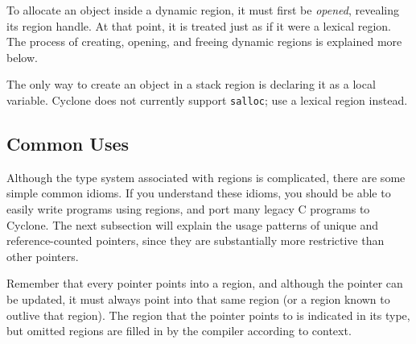 To allocate an object inside a dynamic region, it must first be
\emph{opened}, revealing its region handle.  At that point, it is treated
just as if it were a lexical region.  The process of creating, opening, and
freeing dynamic regions is explained more below.

The only way to create an object in a stack region is declaring it as
a local variable.  Cyclone does not currently support \texttt{salloc};
use a lexical region instead.

\subsection{Common Uses}
\label{sec:common-use}

Although the type system associated with regions is complicated, there are
some simple common idioms.  If you understand these idioms, you should be
able to easily write programs using regions, and port many legacy C programs
to Cyclone.  The next subsection will explain the usage patterns of unique
and reference-counted pointers, since they are substantially more
restrictive than other pointers.

Remember that every pointer points into a region, and although the
pointer can be updated, it must always point into that same region (or
a region known to outlive that region).  The region that the pointer
points to is indicated in its type, but omitted regions are filled in
by the compiler according to context.



